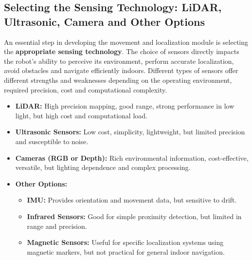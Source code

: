 \subsection{Selecting the Sensing Technology: LiDAR, Ultrasonic, Camera and Other Options}

An essential step in developing the movement and localization module is selecting the \textbf{appropriate sensing technology}. The choice of sensors directly impacts the robot’s ability to perceive its environment, perform accurate localization, avoid obstacles and navigate efficiently indoors. Different types of sensors offer different strengths and weaknesses depending on the operating environment, required precision, cost and computational complexity.

\begin{itemize}
    \item \textbf{LiDAR:} High precision mapping, good range, strong performance in low light, but high cost and computational load.
    \item \textbf{Ultrasonic Sensors:} Low cost, simplicity, lightweight, but limited precision and susceptible to noise.
    \item \textbf{Cameras (RGB or Depth):} Rich environmental information, cost-effective, versatile, but lighting dependence and complex processing.
    \item \textbf{Other Options:}
    \begin{itemize}
        \item \textbf{IMU:} Provides orientation and movement data, but sensitive to drift.
        \item \textbf{Infrared Sensors:} Good for simple proximity detection, but limited in range and precision.
        \item \textbf{Magnetic Sensors:} Useful for specific localization systems using magnetic markers, but not practical for general indoor navigation.
    \end{itemize}
\end{itemize}
